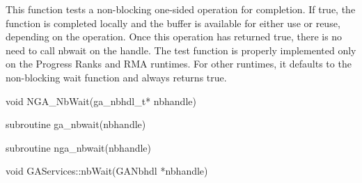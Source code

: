 \documentclass[12pt]{article}
\begin{document}
\ncoll

\begin{desc}
This function tests a non-blocking one-sided operation for completion. If true,
the function is completed locally and the buffer is available for either use or
reuse, depending on the operation. Once this operation has returned true, there
is no need to call nbwait on the handle. The test function is properly
implemented only on the Progress Ranks and RMA runtimes. For other runtimes, it
defaults to the non-blocking wait function and always returns true.
\end{desc}



\begin{capi}
\begin{ccode}
void NGA_NbWait(ga_nbhdl_t* nbhandle)
\end{ccode}
\begin{funcargs}
\end{funcargs}
\end{capi}

\begin{fapi}
\begin{fcode}
subroutine ga_nbwait(nbhandle)
\end{fcode}
\begin{funcargs}
\end{funcargs}
\end{fapi}

\begin{fapi}
\begin{fcode}
subroutine nga_nbwait(nbhandle)
\end{fcode}
\begin{funcargs}
\end{funcargs}
\end{fapi}

\begin{cxxapi}
\begin{cxxcode}
void GAServices::nbWait(GANbhdl *nbhandle)
\end{cxxcode}
\begin{funcargs}
\end{funcargs}
\end{cxxapi}
\end{document}
